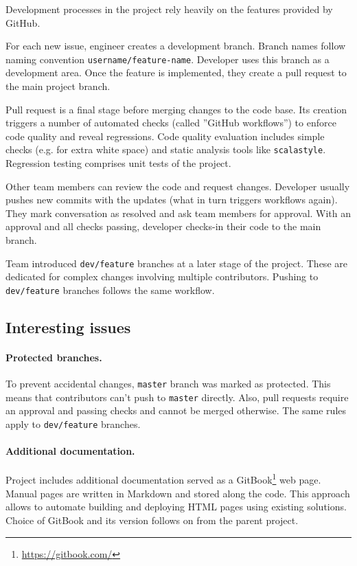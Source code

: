 Development processes in the project rely heavily on the features provided by GitHub.

For each new issue, engineer creates a development branch. Branch names follow naming convention \texttt{username/feature-name}.
Developer uses this branch as a development area.
Once the feature is implemented, they create a pull request to the main project branch.

Pull request is a final stage before merging changes to the code base.
Its creation triggers a number of automated checks (called ''GitHub workflows'') to enforce code quality and reveal regressions.
Code quality evaluation includes simple checks (e.g. for extra white space) and static analysis tools like \texttt{scalastyle}.
Regression testing comprises unit tests of the project.

Other team members can review the code and request changes.
Developer usually pushes new commits with the updates (what in turn triggers workflows again).
They mark conversation as resolved and ask team members for approval.
With an approval and all checks passing, developer checks-in their code to the main branch.

Team introduced \texttt{dev/feature} branches at a later stage of the project.
These are dedicated for complex changes involving multiple contributors.
Pushing to \texttt{dev/feature} branches follows the same workflow.

\subsection{Interesting issues}

\paragraph{Protected branches.}
To prevent accidental changes, \texttt{master} branch was marked as protected.
This means that contributors can't push to \texttt{master} directly.
Also, pull requests require an approval and passing checks and cannot be merged otherwise.
The same rules apply to \texttt{dev/feature} branches.

\paragraph{Additional documentation.}
Project includes additional documentation served as a GitBook\footnote{\href{https://gitbook.com/}{https://gitbook.com/}} web page.
Manual pages are written in Markdown and stored along the code.
This approach allows to automate building and deploying HTML pages using existing solutions.
Choice of GitBook and its version follows on from the parent project.
